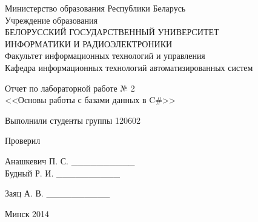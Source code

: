 \thispagestyle{empty}
\setlength{\parindent}{0ex} %

\begin{center}
  Министерство образования Республики Беларусь \\
  \vspace{0.5ex}
  Учреждение образования \\
  БЕЛОРУССКИЙ ГОСУДАРСТВЕННЫЙ УНИВЕРСИТЕТ \\
  ИНФОРМАТИКИ И РАДИОЭЛЕКТРОНИКИ \\
  \vspace{0.5ex}
  Факультет информационных технологий и управления \\
  \vspace{0.5ex}
  Кафедра информационных технологий автоматизированных систем
\end{center}

\vspace{50mm}

\begin{center}
  Отчет по лабораторной работе № 2 \\
  <<Основы работы с базами данных в C\#>>
\end{center}

\vspace{40mm}

\begin{minipage}{.55\linewidth}
    Выполнили студенты группы 120602

    \vspace{8mm}

    Проверил
\end{minipage}
\hfill
\begin{minipage}{.4\linewidth}
  \begin{flushright}
    Анашкевич П. С. \_\_\_\_\_\_\_\_\_\_ \\
    Будный Р. И.    \_\_\_\_\_\_\_\_\_\_
    
    \smallskip

    Заяц А. В. \_\_\_\_\_\_\_\_\_\_
  \end{flushright}
\end{minipage}

\vspace{60mm}
\begin{center}
  Минск 2014
\end{center}

\setlength{\parindent}{1.25cm} %

\newpage
